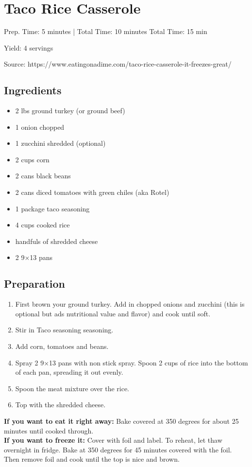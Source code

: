 \section{Taco Rice Casserole}

\begin{center}
Prep. Time: 5 minutes |
Total Time: 10 minutes
Total Time: 15 min

\noindent Yield: 4 servings

\vspace{1em}

  Source: https://www.eatingonadime.com/taco-rice-casserole-it-freezes-great/
\end{center}

\subsection{Ingredients}
\begin{multicols}{2}
\begin{itemize}
  \item 2 lbs ground turkey (or ground beef)
  \item 1 onion chopped
  \item 1 zucchini shredded (optional)
  \item 2 cups corn
  \item 2 cans black beans
  \item 2 cans diced tomatoes with green chiles (aka Rotel)
  \item 1 package taco seasoning
  \item 4 cups cooked rice
  \item handfuls of shredded cheese
  \item 2 9×13 pans
\end{itemize}
\end{multicols}

\subsection{Preparation}
\begin{enumerate}
  \item First brown your ground turkey. Add in chopped onions and zucchini (this is optional but ads nutritional value and flavor) and cook until soft.
  \item Stir in Taco seasoning seasoning.
  \item Add corn, tomatoes and beans.
  \item Spray 2 9×13 pans with non stick spray. Spoon 2 cups of rice into the bottom of each pan, spreading it out evenly.
  \item Spoon the meat mixture over the rice.
  \item Top with the shredded cheese.
\end{enumerate}
\textbf{If you want to eat it right away:} Bake covered at 350 degrees for about 25 minutes until cooked through.\\
\textbf{If you want to freeze it:} Cover with foil and label.
To reheat, let thaw overnight in fridge.
Bake at 350 degrees for 45 minutes covered with the foil.
Then remove foil and cook until the top is nice and brown.

